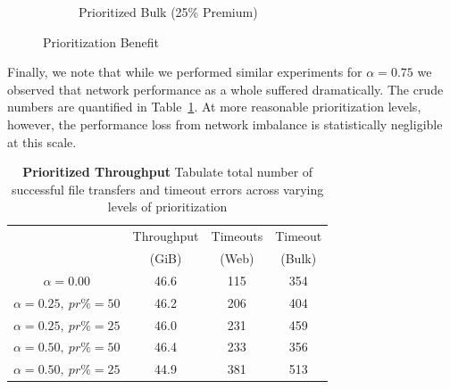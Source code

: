 \begin{figure}
\begin{subfigure}[t]{0.49\textwidth}
\label{fig:modifier_pr25_bulk}
		\vspace{-0.38cm}
		\caption{Prioritized Bulk (25\% Premium)}
	\end{subfigure}
	\caption{Prioritization Benefit}
\end{figure}

Finally, we note that while we performed similar experiments for $\alpha = 0.75$
we observed that network performance as a whole suffered dramatically. The crude
numbers are quantified in Table~\ref{tab:modifier}. At more reasonable
prioritization levels, however, the performance loss from network imbalance is
statistically negligible at this scale.

\begin{table}
  \caption[Prioritized Throughput]{\textbf{Prioritized Throughput} Tabulate total
    number of successful file transfers and timeout errors across varying levels
    of prioritization}
  \begin{center}
    \begin{tabular}{ c c c c}
      & Throughput & Timeouts & Timeout \\
      & (GiB) & (Web) & (Bulk) \\ \hline
      $\alpha = 0.00$ & 46.6 & 115 & 354 \\ \hline
      $\alpha = 0.25,\ pr\% = 50$ & 46.2 & 206 & 404 \\
      $\alpha = 0.25,\ pr\% = 25$ & 46.0 & 231 & 459 \\ \hline
      $\alpha = 0.50,\ pr\% = 50$ & 46.4 & 233 & 356 \\
      $\alpha = 0.50,\ pr\% = 25$ & 44.9 & 381 & 513 \\
    \end{tabular}
  \end{center}
  \label{tab:modifier}
\end{table}
